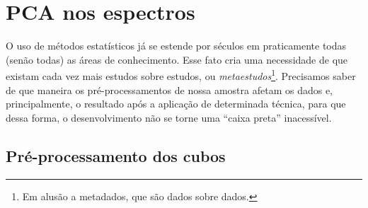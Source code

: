 



\chapter{PCA nos espectros}
\label{sec:UsoPCA}

O uso de métodos estatísticos já se estende por séculos em praticamente todas
(senão todas) as áreas de conhecimento. Esse fato cria uma necessidade de que
existam cada vez mais estudos sobre estudos, ou {\em metaestudos}\footnote{Em
alusão a metadados, que são dados sobre dados.}. Precisamos saber de que maneira
os pré-processamentos de nossa amostra afetam os dados e, principalmente, o
resultado após a aplicação de determinada técnica, para que dessa forma, o
desenvolvimento não se torne uma ``caixa preta'' inacessível.

\section{Pré-processamento dos cubos}
\label{sec:UsoPCA:PCAlidades}

